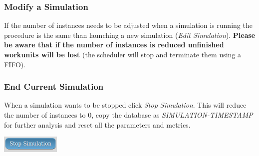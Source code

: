 \documentclass[journal abbreviation, manuscript]{copernicus}
\begin{document}
\subsubsection{Modify a Simulation}
If the number of instances needs to be adjusted when a simulation is running the procedure is the same than launching a new simulation (\textit{Edit Simulation}). \textbf{Please be aware that if the number of instances is reduced unfinished workunits will be lost} (the scheduler will stop and terminate them using a FIFO).

\subsubsection{End Current Simulation}
When a simulation wants to be stopped click \textit{Stop Simulation}. This will reduce the number of instances to 0, copy the database as \textit{SIMULATION-TIMESTAMP} for further analysis and reset all the parameters and metrics.
\begin{center}
  \includegraphics[width=1.1in]{images/screenshots/simulation/simulation03.png}
\end{center}







\end{document}
